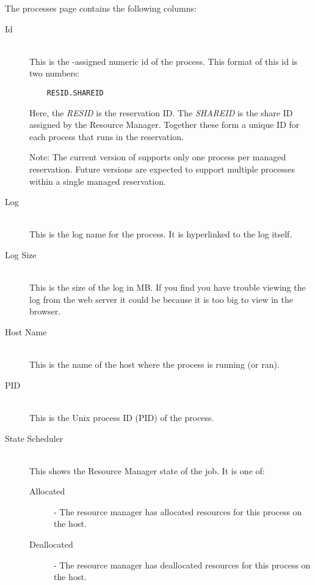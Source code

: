    The processes page contains the following columns:
   \begin{description}
      \item[Id] \hfill \\
        This is the {\DUCC}-assigned numeric id of the process.  This format of this
        id is two numbers:
\begin{verbatim}
    RESID.SHAREID
\end{verbatim}
        Here, the {\em RESID} is the reservation ID.  The {\em SHAREID} is the 
        share ID assigned by the Resource Manager.  Together these form a unique
        ID for each process that runs in the reservation.
        
        Note: The current version of {\DUCC} supports only one process per managed
        reservation.  Future versions are expected to support multiple processes
        within a single managed reservation.
        
      \item[Log] \hfill \\
        This is the log name for the process. It is hyperlinked to the log itself.
        
      \item[Log Size] \hfill \\
        This is the size of the log in MB. If you find you have trouble viewing the log
        from the web server it could be because it is too big to view in the browser.
        
      \item[Host Name] \hfill \\
        This is the name of the host where the process is running (or ran).
        
      \item[PID] \hfill \\
        This is the Unix process ID (PID) of the process.
        
      \item[State Scheduler] \hfill \\
        This shows the Resource Manager state of the job. It is one of:
        
        \begin{description}
            \item[Allocated] - The resource manager has allocated resources for this process on the host.
            \item[Deallocated] - The resource manager has deallocated resources for this process on the host.
        \end{description}
        

\end{description}

